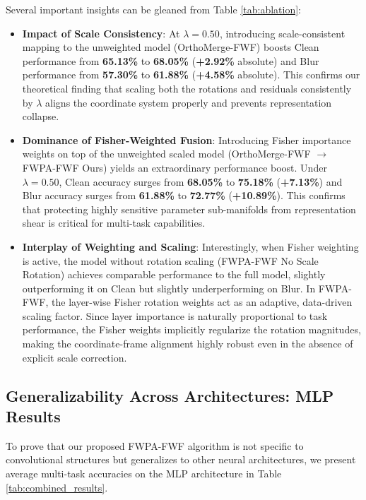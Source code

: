 \documentclass{article}
\theoremstyle{plain}
\theoremstyle{definition}
\theoremstyle{remark}
\begin{document}
Several important insights can be gleaned from Table \ref{tab:ablation}:
\begin{itemize}
    \item \textbf{Impact of Scale Consistency}: At $\lambda=0.50$, introducing scale-consistent mapping to the unweighted model (OrthoMerge-FWF) boosts Clean performance from \textbf{65.13\%} to \textbf{68.05\%} (\textbf{+2.92\%} absolute) and Blur performance from \textbf{57.30\%} to \textbf{61.88\%} (\textbf{+4.58\%} absolute). This confirms our theoretical finding that scaling both the rotations and residuals consistently by $\lambda$ aligns the coordinate system properly and prevents representation collapse.
    \item \textbf{Dominance of Fisher-Weighted Fusion}: Introducing Fisher importance weights on top of the unweighted scaled model (OrthoMerge-FWF $\to$ FWPA-FWF Ours) yields an extraordinary performance boost. Under $\lambda=0.50$, Clean accuracy surges from \textbf{68.05\%} to \textbf{75.18\%} (\textbf{+7.13\%}) and Blur accuracy surges from \textbf{61.88\%} to \textbf{72.77\%} (\textbf{+10.89\%}). This confirms that protecting highly sensitive parameter sub-manifolds from representation shear is critical for multi-task capabilities.
    \item \textbf{Interplay of Weighting and Scaling}: Interestingly, when Fisher weighting is active, the model without rotation scaling (FWPA-FWF No Scale Rotation) achieves comparable performance to the full model, slightly outperforming it on Clean but slightly underperforming on Blur. In FWPA-FWF, the layer-wise Fisher rotation weights act as an adaptive, data-driven scaling factor. Since layer importance is naturally proportional to task performance, the Fisher weights implicitly regularize the rotation magnitudes, making the coordinate-frame alignment highly robust even in the absence of explicit scale correction.
\end{itemize}

\subsection{Generalizability Across Architectures: MLP Results}
To prove that our proposed FWPA-FWF algorithm is not specific to convolutional structures but generalizes to other neural architectures, we present average multi-task accuracies on the MLP architecture in Table \ref{tab:combined_results}. 
\end{document}
